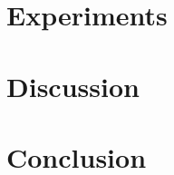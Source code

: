 \documentclass[]{IEEEtran}
\begin{document}





\section{Experiments}

\section{Discussion}

\section{Conclusion}
\end{document}
